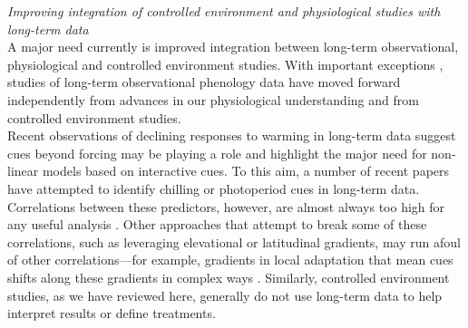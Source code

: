 \documentclass[11pt,letter]{article}
\begin{document}
\emph{Improving integration of controlled environment and physiological studies with long-term data}\\
A major need currently is improved integration between long-term observational, physiological and controlled environment studies. With important exceptions \citep{gauzere2017}, studies of long-term observational phenology data have moved forward independently from advances in our physiological understanding and from controlled environment studies. \\

Recent observations of declining responses to warming in long-term data suggest cues beyond forcing may be playing a role \citep{fu2015} and highlight the major need for non-linear models based on interactive cues. To this aim, a number of recent papers have attempted to identify chilling or photoperiod cues in long-term data. Correlations between these predictors, however, are almost always too high for any useful analysis \citep{sarahailene2020,ettinger2020}. Other approaches that attempt to break some of these correlations, such as leveraging elevational or latitudinal gradients, may run afoul of other correlations---for example, gradients in local adaptation that mean cues shifts along these gradients in complex ways \citep{tansey2017}. Similarly, controlled environment studies, as we have reviewed here, generally do not use long-term data to help interpret results or define treatments. \\
\end{document}
